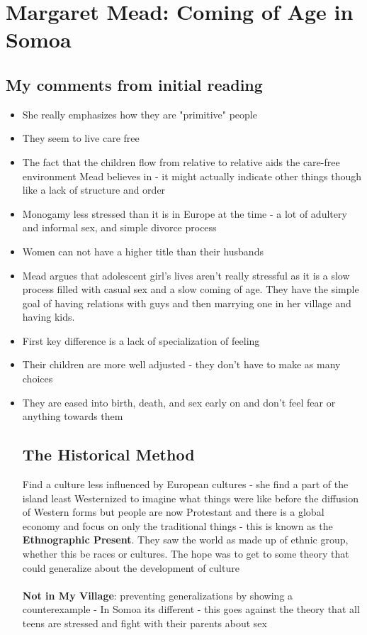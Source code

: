 \documentclass{article}
\begin{document}
\section{Margaret Mead: Coming of Age in Somoa}
\subsection{My comments from initial reading}
\begin{itemize}
\item She really emphasizes how they are "primitive" people
\item They seem to live care free
\item The fact that the children flow from relative to relative aids the care-free environment Mead believes in - it might actually indicate other things though like a lack of structure and order
\item Monogamy less stressed than it is in Europe at the time - a lot of adultery and informal sex, and simple divorce process
\item Women can not have a higher title than their husbands
\item Mead argues that adolescent girl's lives aren't really stressful as it is a slow process filled with casual sex and a slow coming of age. They have the simple goal of having relations with guys and then marrying one in her village and having kids.
\item First key difference is a lack of specialization of feeling
\item Their children are more well adjusted - they don't have to make as many choices
\item They are eased into birth, death, and sex early on and don't feel fear or anything towards them 

\subsection{The Historical Method}
Find a culture less influenced by European cultures - she find a part of the island least Westernized to imagine what things were like before the diffusion of Western forms but people are now Protestant and there is a global economy and focus on only the traditional things - this is known as the \textbf{Ethnographic Present}. They saw the world as made up of ethnic group, whether this be races or cultures. The hope was to get to some theory that could generalize about the development of culture \\ \\ 
\textbf{Not in My Village}: preventing generalizations by showing a counterexample - In Somoa its different - this goes against the theory that all teens are stressed and fight with their parents about sex 


\end{itemize}
\end{document}
